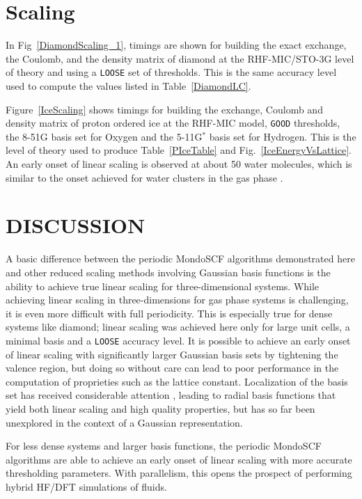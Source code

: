 \documentclass[prb,aps,nobibnotes,twocolumn,doublespace,twocolumngrid,superbib,showpacs]{revtex4}
\begin{document}
\section{Scaling}\label{scaling}

In Fig~\ref{DiamondScaling_1}, timings are shown for building the exact exchange, the Coulomb, 
and the density matrix of diamond at the RHF-MIC/STO-3G level of theory and using a {\tt LOOSE} 
set of thresholds.  This is the same accuracy level used to compute the values listed in Table~\ref{DiamondLC}.

Figure~\ref{IceScaling} shows timings for building the  exchange, Coulomb and density matrix
of proton ordered ice \cite{SCasassa97} at the RHF-MIC model, {\tt GOOD} thresholds, the 8-51G basis 
set for Oxygen and the 5-11G$^*$ basis set for Hydrogen.  This is the level of theory used to
produce Table~\ref{PIceTable} and Fig.~\ref{IceEnergyVsLattice}.  An early onset of linear scaling 
is observed at about 50 water molecules, which is similar to the onset achieved for water clusters 
in the gas phase \cite{ANiklasson03}.

\section{DISCUSSION}\label{discussion}

A basic difference between the periodic {\sc MondoSCF} algorithms demonstrated 
here and other reduced scaling methods involving Gaussian basis functions is the 
ability to achieve true linear scaling for three-dimensional systems.  While 
achieving linear scaling in three-dimensions for gas phase systems is challenging, 
it is even more difficult with full periodicity.  This is especially true for
dense systems like diamond;  linear scaling was achieved here only for large unit cells, 
a minimal basis and a {\tt LOOSE} accuracy level.  It is possible to achieve
an early onset of linear scaling with significantly larger Gaussian basis sets by 
tightening the valence region, but doing so without care can lead to  poor 
performance in the computation of proprieties such as the lattice constant.  
Localization of the  basis set  has received considerable attention 
\cite{SKenny00,JJunquera01,EAnglada02,CGan03},
leading to radial basis functions that yield both linear scaling and high quality properties,
but has so far been unexplored in the context of a Gaussian representation.

For less dense systems and larger basis functions, the periodic {\sc MondoSCF} algorithms 
are able to achieve an early onset of linear scaling with more accurate thresholding parameters.
With parallelism, this opens the prospect of performing hybrid HF/DFT simulations of fluids. 
\end{document}
